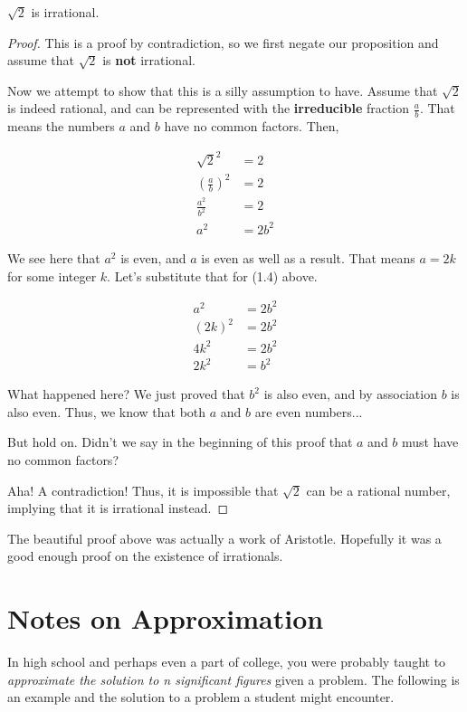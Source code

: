 \begin{theorem}
    $\sqrt{2}$ is irrational.
\end{theorem}
\begin{proof}
    This is a proof by contradiction, so we first negate our proposition and assume that $\sqrt{2}$ is \textbf{not} irrational.

    Now we attempt to show that this is a silly assumption to have. Assume that $\sqrt{2}$ is indeed rational, and can be represented with the \textbf{irreducible} fraction $\frac{a}{b}$. That means the numbers $a$ and $b$ have no common factors. Then,

    \begin{align}
        \sqrt{2}^2 &= 2\\
        \left(\frac{a}{b}\right)^2 &= 2 \\
        \frac{a^2}{b^2} &= 2\\
        a^2 &= 2b^2
    \end{align}

    We see here that $a^2$ is even, and $a$ is even as well as a result. That means $a = 2k$ for some integer $k$. Let's substitute that for (1.4) above.

    \begin{align}
        a^2 &= 2b^2\\
        (2k)^2 &= 2b^2\\
        4k^2 &= 2b^2\\
        2k^2 &= b^2
    \end{align}

    What happened here? We just proved that $b^2$ is also even, and by association $b$ is also even. Thus, we know that both $a$ and $b$ are even numbers... 

    But hold on. Didn't we say in the beginning of this proof that $a$ and $b$ must have no common factors? 

    Aha! A contradiction! Thus, it is impossible that $\sqrt{2}$ can be a rational number, implying that it is irrational instead.
\end{proof}

The beautiful proof above was actually a work of Aristotle. Hopefully it was a good enough proof on the existence of irrationals. 

\section{Notes on Approximation}

In high school and perhaps even a part of college, you were probably taught to \textit{approximate the solution to n significant figures} given a problem. The following is an example and the solution to a problem a student might encounter.

